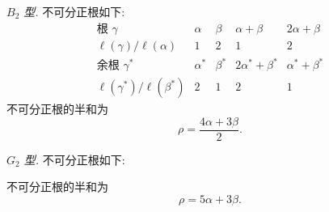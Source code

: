 \medskip
\noindent\emph{\(B_2\) 型.}
不可分正根如下:
\[
\begin{array}{c|cccc}
\text{根 }\gamma
 &\alpha&\beta&\alpha+\beta&2\alpha+\beta\\ \hline
\ell(\gamma)/\ell(\alpha)
 &1&2&1&2\\ \hline
\text{余根 }\gamma^\ast
 &\alpha^\ast&\beta^\ast
 &2\alpha^\ast+\beta^\ast&\alpha^\ast+\beta^\ast\\ \hline
\ell(\gamma^\ast)/\ell(\beta^\ast)
 &2&1&2&1
\end{array}
\]
不可分正根的半和为
\[
 \rho=\frac{4\alpha+3\beta}{2}.
\]

\medskip
\noindent\emph{\(G_2\) 型.}
不可分正根如下:
\begin{center}
\end{center}
不可分正根的半和为
\[
 \rho=5\alpha+3\beta.
\]

